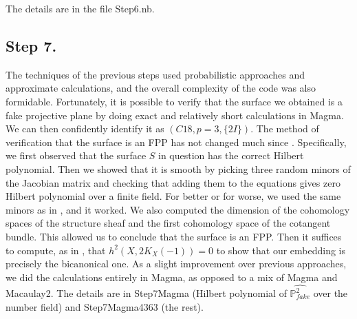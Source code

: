 \documentclass[11pt,reqno]{amsart}
\def\P {{\mathbb P}}
\def\FPP {{\P^2_{fake}}}
\theoremstyle{definition}
\numberwithin{equation}{section}
\begin{document}
\medskip
The details are in the file Step6.nb.

\subsection{Step 7.} The techniques of the previous steps used probabilistic approaches and approximate calculations, and the overall complexity of the code was also formidable. Fortunately, it is possible to verify that the surface we obtained is a fake projective plane by doing exact and relatively short calculations in Magma. We can then confidently identify it as $(C18,p=3,\{2I\})$. The method of verification that the surface is an FPP has not changed much since \cite{BF}. Specifically, we first observed that the surface $S$ in question has the correct Hilbert polynomial. Then we showed that it is smooth by picking three random minors of the Jacobian matrix and checking that adding them to the equations gives zero Hilbert polynomial over a finite field. For better or for worse, we used the same minors as in \cite{BL}, and it worked. We also computed the dimension of the cohomology spaces of the structure sheaf and the first cohomology space of the cotangent bundle. This allowed us to conclude that the surface is an FPP. Then it suffices to compute, as in \cite{B-Keum}, that $h^2(X,2K_X(-1))=0$ to show that our embedding is precisely the bicanonical one. As a slight improvement over previous approaches, we did the calculations entirely in Magma, as opposed to a mix of Magma and Macaulay2. The details are in Step7Magma (Hilbert polynomial of $\widehat\FPP$ over the number field) and Step7Magma4363 (the rest).
\end{document}
